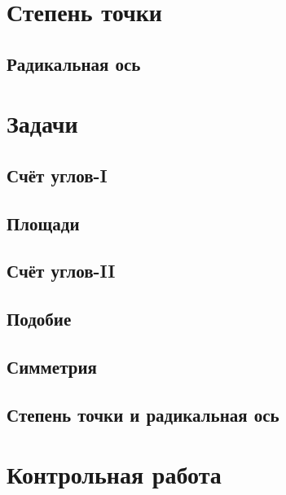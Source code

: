 \documentclass[twoside]{article}
\begin{document}
\section{Степень точки}


\subsection{Радикальная ось}


\newpage
\renewcommand{\thesubsection}{\roman{subsection}}
\setcounter{subsection}{0}

\section*{Задачи}
\subsection{Счёт углов-I}

\subsection{Площади}
% 
\subsection{Счёт углов-II}


\subsection{Подобие}
% 
\subsection{Симметрия}
% 
\subsection{Степень точки и радикальная ось}


\newpage
{}
\section*{Контрольная работа}
% 
\end{document}

